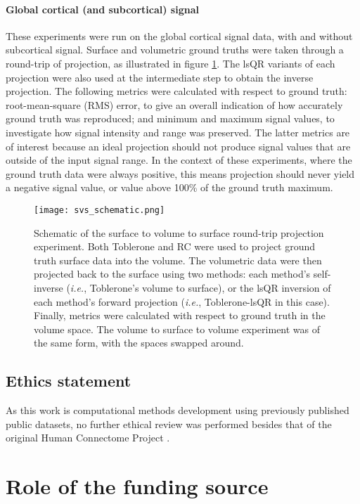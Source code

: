 \documentclass[review]{elsarticle}
\begin{document}
\paragraph{Global cortical (and subcortical) signal} These experiments were run on the global cortical signal data, with and without subcortical signal. Surface and volumetric ground truths were taken through a round-trip of projection, as illustrated in figure \ref{svs_schematic}. The lsQR variants of each projection were also used at the intermediate step to obtain the inverse projection. The following metrics were calculated with respect to ground truth: root-mean-square (RMS) error, to give an overall indication of how accurately ground truth was reproduced; and minimum and maximum signal values, to investigate how signal intensity and range was preserved. The latter metrics are of interest because an ideal projection should not produce signal values that are outside of the input signal range. In the context of these experiments, where the ground truth data were always positive, this means projection should never yield a negative signal value, or value above 100\% of the ground truth maximum. 

\begin{figure}[H]
\centering
\texttt{[image: svs\_schematic.png]}
\caption{Schematic of the surface to volume to surface round-trip projection experiment. Both Toblerone and RC were used to project ground truth surface data into the volume. The volumetric data were then projected back to the surface using two methods: each method's self-inverse (\textit{i.e.}, Toblerone's volume to surface), or the lsQR inversion of each method's forward projection (\textit{i.e.}, Toblerone-lsQR in this case). Finally, metrics were calculated with respect to ground truth in the volume space. The volume to surface to volume experiment was of the same form, with the spaces swapped around.}
\label{svs_schematic}
\end{figure}

\subsection{Ethics statement}

As this work is computational methods development using previously published public datasets, no further ethical review was performed besides that of the original Human Connectome Project \cite{hcp_overview}.

\section{Role of the funding source} 
\end{document}
